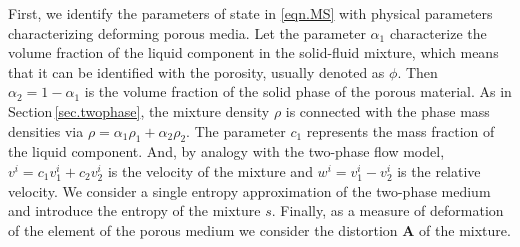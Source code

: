 \documentclass[3p,times,table]{article}
\renewcommand{\AA}{{\bm{A}}}
\begin{document}
First, we identify the parameters of state in \eqref{eqn.MS} with 
physical parameters characterizing 
deforming porous media.
Let the parameter $\alpha_1$ characterize the volume fraction of the liquid component 
in the solid-fluid mixture, which means that it can be identified with the 
porosity,
usually denoted as $ \phi $. Then $\alpha_2=1-\alpha_1$ is the volume fraction 
of the solid phase of the porous material. As in Section\,\ref{sec.twophase}, the mixture density  
$\rho$ is connected 
with the phase mass densities via $\rho=\alpha_1\rho_1+\alpha_2\rho_2$. 
The parameter 
$c_1$ represents the mass fraction of the liquid component. And, by analogy 
with the two-phase flow
model, $v^i=c_1v_1^i+c_2v_2^i$ is the velocity of the mixture and 
$w^i=v_1^i-v_2^i$ is the relative velocity.
We consider a single entropy approximation of the two-phase medium and introduce 
the entropy of the mixture $s$. Finally, as a measure of deformation of the 
element of the porous medium we consider the distortion $\AA$ of the mixture.  
\end{document}
